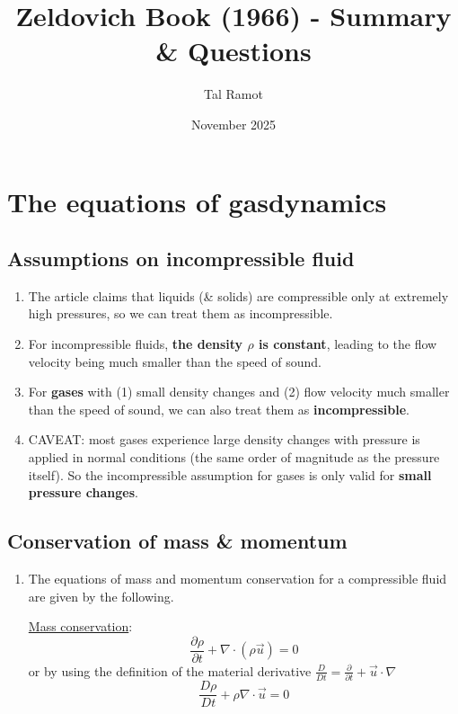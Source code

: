 ﻿\documentclass[11pt]{article}
\title{Zeldovich Book (1966) - Summary \& Questions}
\author{Tal Ramot}
\date{November 2025}
\begin{document}
\maketitle

\section{The equations of gasdynamics}
\subsection{Assumptions on incompressible fluid}
  \begin{enumerate}
    \item The article claims that liquids (\& solids) are compressible only at extremely high pressures, so we can treat them as incompressible. 
    \item For incompressible fluids, \textbf{the density $\rho$ is constant}, leading to the flow velocity being much smaller than the speed of sound.
    \item For \textbf{gases} with (1) small density changes and (2) flow velocity much smaller than the speed of sound, we can also treat them as \textbf{incompressible}.
    \item CAVEAT: most gases experience large density changes with pressure is applied in normal conditions (the same order of magnitude as the pressure itself). So the incompressible assumption for gases is only valid for \textbf{small pressure changes}.
  \end{enumerate}
\subsection{Conservation of mass \& momentum}
  \begin{enumerate}
    \item The equations of mass and momentum conservation for a compressible fluid are given by the following.
     
    \underline{Mass conservation}:
    \begin{equation}
      \frac{\partial \rho}{\partial t} + \nabla \cdot (\rho \vec{u}) = 0
    \end{equation}
    or by using the definition of the material derivative $\frac{D}{Dt} = \frac{\partial}{\partial t} + \vec{u} \cdot \nabla$
    \begin{equation}
      \frac{D\rho}{Dt} + \rho \nabla \cdot \vec{u} = 0
    \end{equation}
  \end{enumerate}
\end{document}
